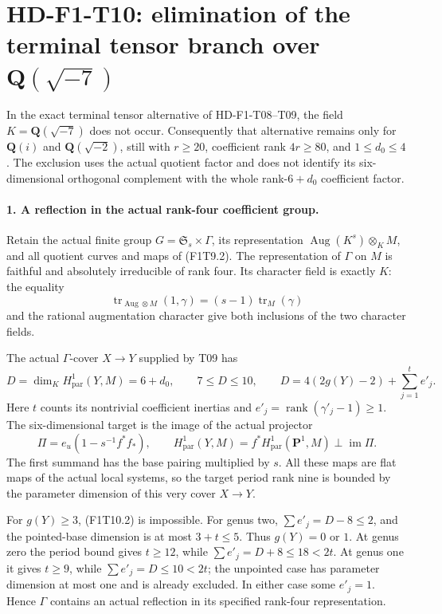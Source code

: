 \section{HD-F1-T10: elimination of the terminal tensor branch over
\texorpdfstring{\(\mathbf Q(\sqrt{-7})\)}{Q(sqrt(-7))}}
\label{sec:f1-terminal-tensor-seven}

In the exact terminal tensor alternative of HD-F1-T08--T09,
the field \(K=\mathbf Q(\sqrt{-7})\) does not occur.
Consequently that alternative remains only for
\(\mathbf Q(i)\) and \(\mathbf Q(\sqrt{-2})\), still with
\(r\ge20\), coefficient rank \(4r\ge80\), and \(1\le d_0\le4\).
The exclusion uses the actual quotient factor and does not identify
its six-dimensional orthogonal complement with the whole
rank-\(6+d_0\) coefficient factor.

\paragraph{1. A reflection in the actual rank-four coefficient group.}
Retain the actual finite group
\(G=\mathfrak S_s\times\Gamma\), its representation
\(\operatorname{Aug}(K^s)\otimes_K M\), and all quotient curves
and maps of (F1T9.2). The representation of \(\Gamma\) on \(M\)
is faithful and absolutely irreducible of rank four.
Its character field is exactly \(K\): the equality
\[
 \operatorname{tr}_{\operatorname{Aug}\otimes M}(1,\gamma)
       =(s-1)\operatorname{tr}_M(\gamma)
 \tag{F1T10.1}
\]
and the rational augmentation character give both inclusions
of the two character fields.

The actual \(\Gamma\)-cover \(X\to Y\) supplied by T09 has
\[
 D=\dim_K H^1_{\mathrm{par}}(Y,M)=6+d_0,\qquad
 7\le D\le10,\qquad
 D=4(2g(Y)-2)+\sum_{j=1}^t e'_j .
 \tag{F1T10.2}
\]
Here \(t\) counts its nontrivial coefficient inertias and
\(e'_j=\operatorname{rank}(\gamma'_j-1)\ge1\).
The six-dimensional target is the image of the actual projector
\[
 \Pi=e_u(1-s^{-1}f^*f_*),
 \qquad H^1_{\mathrm{par}}(Y,M)
     =f^*H^1_{\mathrm{par}}(\mathbf P^1,M)\perp\operatorname{im}\Pi.
 \tag{F1T10.3}
\]
The first summand has the base pairing multiplied by \(s\).
All these maps are flat maps of the actual local systems, so the
target period rank nine is bounded by the parameter dimension
of this very cover \(X\to Y\).

For \(g(Y)\ge3\), (F1T10.2) is impossible. For genus two,
\(\sum e'_j=D-8\le2\), and the pointed-base dimension is at most
\(3+t\le5\). Thus \(g(Y)=0\) or \(1\). At genus zero the
period bound gives \(t\ge12\), while
\(\sum e'_j=D+8\le18<2t\). At genus one it gives \(t\ge9\),
while \(\sum e'_j=D\le10<2t\); the unpointed case has
parameter dimension at most one and is already excluded.
In either case some \(e'_j=1\). Hence \(\Gamma\) contains an
actual reflection in its specified rank-four representation.

